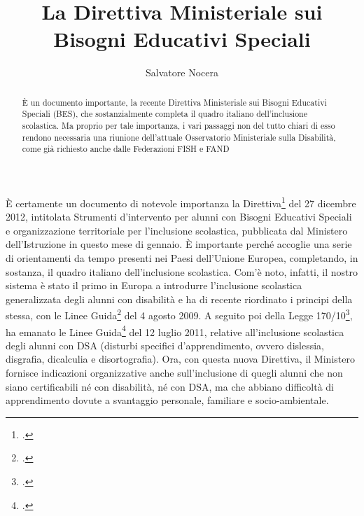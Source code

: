 \author{Salvatore Nocera}
\title{La Direttiva Ministeriale sui Bisogni Educativi Speciali}
\label{cha:nocera310113}
\begin{abstract}
È un documento importante, la recente Direttiva Ministeriale sui Bisogni Educativi Speciali (BES), che sostanzialmente completa il quadro italiano dell’inclusione scolastica. Ma proprio per tale importanza, i vari passaggi non del tutto chiari di esso rendono necessaria una riunione dell’attuale Osservatorio Ministeriale sulla Disabilità, come già richiesto anche dalle Federazioni FISH e FAND
\end{abstract}
\maketitle
{}

È certamente un documento di notevole importanza la Direttiva\footcite{dir27Dic2012} del 27 dicembre 2012, intitolata Strumenti d'intervento per alunni con Bisogni Educativi Speciali e organizzazione territoriale per l'inclusione scolastica, pubblicata dal Ministero dell'Istruzione in questo mese di gennaio. È importante perché accoglie una serie di orientamenti da tempo presenti nei Paesi dell'Unione Europea, completando, in sostanza, il quadro italiano dell'inclusione scolastica.
Com'è noto, infatti, il nostro sistema è stato il primo in Europa a introdurre l'inclusione scolastica generalizzata degli alunni con disabilità e ha di recente riordinato i principi della stessa, con le Linee Guida\footcite{LineGuida2009} del 4 agosto 2009. A seguito poi della Legge 170/10\footcite{legge170}, ha emanato le Linee Guida\footcite{LineGuida2011} del 12 luglio 2011, relative all'inclusione scolastica degli alunni con DSA (disturbi specifici d'apprendimento, ovvero dislessia, disgrafia, dicalculia e disortografia). Ora, con questa nuova Direttiva, il Ministero fornisce indicazioni organizzative anche sull'inclusione di quegli alunni che non siano certificabili né con disabilità, né con DSA, ma che abbiano difficoltà di apprendimento dovute a svantaggio personale, familiare e socio-ambientale.

